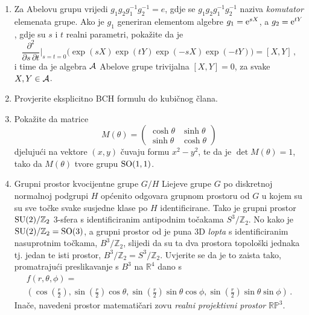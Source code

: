 \begin{enumerate}[label=\arabic{chapter}.\arabic*.]
\item \label{zad:abelovaalgebra} Za Abelovu grupu vrijedi $g_1 g_2 g_{1}^{-1} g_{2}^{-1} = e$,
    gdje se $g_1 g_2 g_{1}^{-1} g_{2}^{-1}$ naziva \emph{komutator} elemenata grupe.
    Ako je $g_1$ generiran elementom algebre $g_1 = \textrm{e}^{s X}$, a $g_2 = \textrm{e}^{t Y}$, gdje su
    $s$ i $t$ realni parametri, pokažite da je
\begin{equation}
\frac{\partial^2}{\partial s \, \partial t} \bigg|_{s=t=0} \big( \exp(sX) \exp(tY)
\exp(-sX) \exp(-tY) \big) = [X, Y] \,,
\end{equation}
i time da je algebra $\mathcal{A}$ Abelove grupe trivijalna $[X, Y] = 0$, za svake $X, Y \in \mathcal{A}$.

\item Provjerite eksplicitno BCH formulu do kubičnog člana.


\item Pokažite da matrice
\begin{equation}
 M(\theta) = \begin{pmatrix}
\cosh\theta & \sinh\theta  \\
\sinh\theta & \cosh\theta
\end{pmatrix}
\end{equation}
djelujući na vektore $(x, y)$ čuvaju formu $x^2 - y^2$, te da 
je $\det M(\theta) = 1$, tako da $M(\theta)$ tvore grupu
$\mathrm{SO}(1,1)$. 
\item Grupni prostor kvocijentne grupe $G/H$ Liejeve grupe $G$ po diskretnoj normalnoj podgrupi $H$
    općenito odgovara grupnom prostoru od $G$ u kojem su su sve točke svake susjedne klase po $H$
    identificirane. Tako je grupni prostor $\mathrm{SU}(2)/\mathbb{Z}_2$ 3-sfera s identificiranim
    antipodnim točakama $S^{3}/\mathbb{Z}_2$.   
    No kako je $\mathrm{SU}(2)/\mathbb{Z}_2 = \mathrm{SO}(3)$, a grupni prostor od
     je puna 3D \emph{lopta} s identificiranim nasuprotnim točkama, $B^{3}/\mathbb{Z}_2$,
    slijedi da su ta dva prostora topološki jednaka tj. jedan te isti prostor,
    $B^{3}/\mathbb{Z}_2 = S^{3}/\mathbb{Z}_2$.
    Uvjerite se da je to zaista tako, promatrajući
    preslikavanje s $B^{3}$ na $\mathbb{R}^4$ dano s
    \begin{multline}
        f(r, \theta, \phi) = \\ \left( 
            \cos\left(\frac{r}{2}\right), 
            \sin\left(\frac{r}{2}\right)\cos\theta, 
            \sin\left(\frac{r}{2}\right)\sin\theta\cos\phi, 
            \sin\left(\frac{r}{2}\right)\sin\theta\sin\phi 
            \right) \,.
    \end{multline}
    Inače, navedeni prostor matematičari zovu \emph{realni projektivni prostor}
    $\mathbb{RP}^{3}$. 
\end{enumerate}
